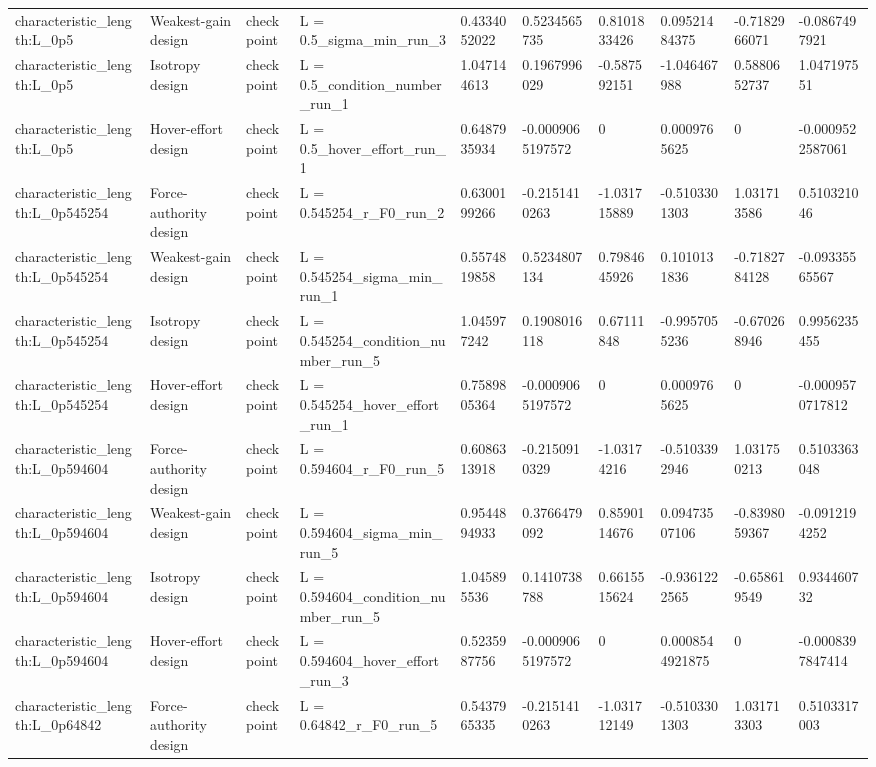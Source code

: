 \begin{tabular}{@{}llllllllll@{}}
characteristic\_length:L\_0p5 & Weakest-gain design & checkpoint & L = 0.5\_sigma\_min\_run\_3 & 0.4334052022 & 0.5234565735 & 0.8101833426 & 0.09521484375 & -0.7182966071 & -0.0867497921 \\
characteristic\_length:L\_0p5 & Isotropy design & checkpoint & L = 0.5\_condition\_number\_run\_1 & 1.047144613 & 0.1967996029 & -0.587592151 & -1.046467988 & 0.5880652737 & 1.047197551 \\
characteristic\_length:L\_0p5 & Hover-effort design & checkpoint & L = 0.5\_hover\_effort\_run\_1 & 0.6487935934 & -0.0009065197572 & 0 & 0.0009765625 & 0 & -0.0009522587061 \\
characteristic\_length:L\_0p545254 & Force-authority design & checkpoint & L = 0.545254\_r\_F0\_run\_2 & 0.6300199266 & -0.2151410263 & -1.031715889 & -0.5103301303 & 1.031713586 & 0.510321046 \\
characteristic\_length:L\_0p545254 & Weakest-gain design & checkpoint & L = 0.545254\_sigma\_min\_run\_1 & 0.5574819858 & 0.5234807134 & 0.7984645926 & 0.1010131836 & -0.7182784128 & -0.09335565567 \\
characteristic\_length:L\_0p545254 & Isotropy design & checkpoint & L = 0.545254\_condition\_number\_run\_5 & 1.045977242 & 0.1908016118 & 0.67111848 & -0.9957055236 & -0.670268946 & 0.9956235455 \\
characteristic\_length:L\_0p545254 & Hover-effort design & checkpoint & L = 0.545254\_hover\_effort\_run\_1 & 0.7589805364 & -0.0009065197572 & 0 & 0.0009765625 & 0 & -0.0009570717812 \\
characteristic\_length:L\_0p594604 & Force-authority design & checkpoint & L = 0.594604\_r\_F0\_run\_5 & 0.6086313918 & -0.2150910329 & -1.03174216 & -0.5103392946 & 1.031750213 & 0.5103363048 \\
characteristic\_length:L\_0p594604 & Weakest-gain design & checkpoint & L = 0.594604\_sigma\_min\_run\_5 & 0.9544894933 & 0.3766479092 & 0.8590114676 & 0.09473507106 & -0.8398059367 & -0.0912194252 \\
characteristic\_length:L\_0p594604 & Isotropy design & checkpoint & L = 0.594604\_condition\_number\_run\_5 & 1.045895536 & 0.1410738788 & 0.6615515624 & -0.9361222565 & -0.658619549 & 0.934460732 \\
characteristic\_length:L\_0p594604 & Hover-effort design & checkpoint & L = 0.594604\_hover\_effort\_run\_3 & 0.5235987756 & -0.0009065197572 & 0 & 0.0008544921875 & 0 & -0.0008397847414 \\
characteristic\_length:L\_0p64842 & Force-authority design & checkpoint & L = 0.64842\_r\_F0\_run\_5 & 0.5437965335 & -0.2151410263 & -1.031712149 & -0.5103301303 & 1.031713303 & 0.5103317003 \\

\end{tabular}
